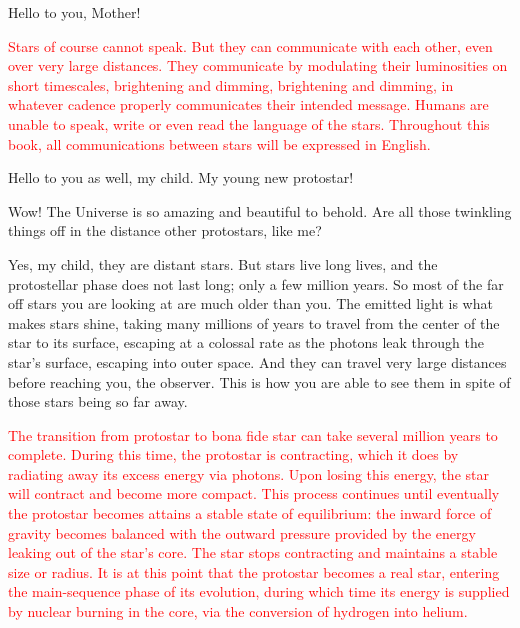 \documentclass[main.tex]{subfiles}
\begin{document}
\par \Maia Hello to you, Mother!

\begin{tcolorbox}[sharp corners, colback=red!30, colframe=red!80!blue, title=Stellar Communication]
\par \textcolor{red} {Stars of course cannot speak.  But they can communicate with each other, even over very large distances.  They communicate by modulating their luminosities on short timescales, brightening and dimming, brightening and dimming, in whatever cadence properly communicates their intended message.  Humans are unable to speak, write or even read the language of the stars.  Throughout this book, all communications between stars will be expressed in English.} 
\end{tcolorbox}

\par \Pleione Hello to you as well, my child.  My young new protostar!

\par \Maia Wow!  The Universe is so amazing and beautiful to behold.  Are all those twinkling things off in the distance other protostars, like me?

\par \Pleione Yes, my child, they are distant stars.  But stars live long lives, and the protostellar phase does not last long; only a few million years.  So most of the far off stars you are looking at are much older than you.  The emitted light is what makes stars shine, taking many millions of years to travel from the center of the star to its surface, escaping at a colossal rate as the photons leak through the star's surface, escaping into outer space.  And they can travel very large distances before reaching you, the observer.  This is how you are able to see them in spite of those stars being so far away.  

\begin{tcolorbox}[sharp corners, colback=red!30, colframe=red!80!blue, title=From Protostar to Bona Fide Star]
\par \textcolor{red} {The transition from protostar to bona fide star can take several million years to complete.  During this time, the protostar is contracting, which it does by radiating away its excess energy via photons.  Upon losing this energy, the star will contract and become more compact.  This process continues until eventually the protostar becomes attains a stable state of equilibrium:  the inward force of gravity becomes balanced with the outward pressure provided by the energy leaking out of the star's core.  The star stops contracting and maintains a stable size or radius.  It is at this point that the protostar becomes a real star, entering the main-sequence phase of its evolution, during which time its energy is supplied by nuclear burning in the core, via the conversion of hydrogen into helium.}
\end{tcolorbox}
\end{document}
